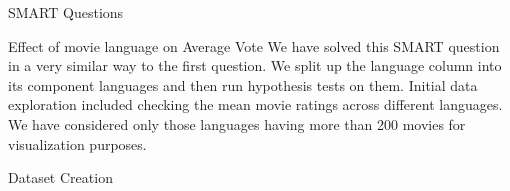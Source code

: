 \documentclass[
  ignorenonframetext,
]{beamer}
\newenvironment{Shaded}{\begin{snugshade}}{\end{snugshade}}
\newcommand{\AttributeTok}[1]{\textcolor[rgb]{0.77,0.63,0.00}{#1}}
\newcommand{\CommentTok}[1]{\textcolor[rgb]{0.56,0.35,0.01}{\textit{#1}}}
\newcommand{\ConstantTok}[1]{\textcolor[rgb]{0.00,0.00,0.00}{#1}}
\newcommand{\FunctionTok}[1]{\textcolor[rgb]{0.00,0.00,0.00}{#1}}
\newcommand{\NormalTok}[1]{#1}
\newcommand{\OtherTok}[1]{\textcolor[rgb]{0.56,0.35,0.01}{#1}}
\newcommand{\SpecialCharTok}[1]{\textcolor[rgb]{0.00,0.00,0.00}{#1}}
\newcommand{\StringTok}[1]{\textcolor[rgb]{0.31,0.60,0.02}{#1}}
\begin{document}
\begin{frame}[fragile]{SMART Questions}
\begin{block}{Effect of movie language on Average Vote}
\protect\hypertarget{effect-of-movie-language-on-average-vote}{}
We have solved this SMART question in a very similar way to the first
question. We split up the language column into its component languages
and then run hypothesis tests on them. Initial data exploration included
checking the mean movie ratings across different languages. We have
considered only those languages having more than 200 movies for
visualization purposes.

\begin{block}{Dataset Creation}
\protect\hypertarget{dataset-creation}{}
\begin{Shaded}
\end{Shaded}
\end{block}
\end{block}
\end{frame}
\end{document}
